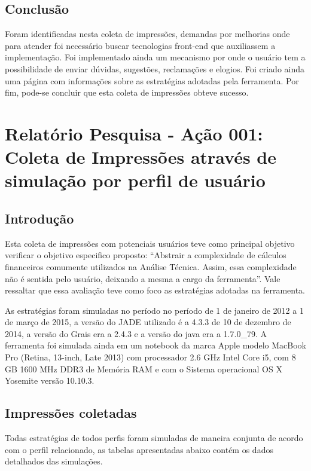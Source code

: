 \begin{apendicesenv}
\section{Conclusão} 

Foram identificadas nesta coleta de impressões, demandas por melhorias onde para atender foi necessário buscar tecnologias front-end que auxiliassem a implementação. Foi implementado ainda um mecanismo por onde o usuário tem a possibilidade de enviar dúvidas, sugestões, reclamações e elogios. Foi criado ainda uma página com informações sobre as estratégias adotadas pela ferramenta. Por fim, pode-se concluir que esta coleta de impressões obteve sucesso. 

\chapter[RELATÓRIO PESQUISA - AÇÃO 002]{Relatório Pesquisa - Ação 001: Coleta de Impressões através de simulação por perfil de usuário}
\section{Introdução}

Esta coleta de impressões com potenciais usuários teve como principal objetivo verificar  o objetivo especifico proposto: “Abstrair a complexidade de cálculos financeiros comumente utilizados na Análise Técnica. Assim, essa complexidade não é sentida pelo usuário, deixando a mesma a cargo da ferramenta”. Vale ressaltar que essa avaliação teve como foco as estratégias adotadas na ferramenta.

As estratégias foram simuladas no período no período de 1 de janeiro de 2012 a 1 de março de 2015, a versão do JADE utilizado é a 4.3.3 de 10 de dezembro de 2014, a versão do Grais era a 2.4.3 e a versão do java era a 1.7.0\_79. A ferramenta foi simulada ainda em um notebook da marca Apple modelo MacBook Pro (Retina, 13-inch, Late 2013) com processador 2.6 GHz Intel Core i5, com 8 GB 1600 MHz DDR3 de Memória RAM e com o Sistema operacional OS X Yosemite versão 10.10.3.

\section{Impressões coletadas}

Todas estratégias de todos perfis foram simuladas de maneira conjunta de acordo com o perfil relacionado, as tabelas apresentadas abaixo contém os dados detalhados das simulações.



\end{apendicesenv}
